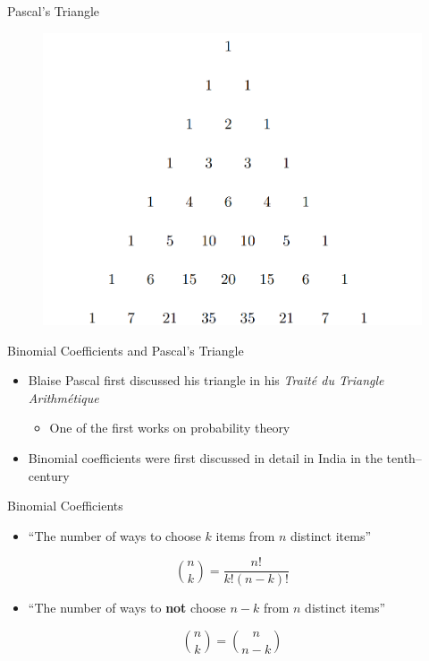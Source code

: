 \documentclass[aspectratio=169]{beamer}
\begin{document}
\begin{frame}{Pascal's Triangle}
    \begin{figure}
        \centering
        \includegraphics[scale=1]{images/Pascal8.png}
    \end{figure}
\end{frame}

\begin{frame}{Binomial Coefficients and Pascal's Triangle}
    \begin{itemize}
        \item Blaise Pascal first discussed his triangle in his \textit{Trait\'e du Triangle Arithm\'etique} \cite{book:arithmetique}
        \begin{itemize}
            \item One of the first works on probability theory
        \end{itemize} \pause
        \item Binomial coefficients were first discussed in detail in India in the tenth--century \cite{book:TAOCP1}
    \end{itemize}
\end{frame}

\begin{frame}{Binomial Coefficients}
    \begin{itemize}
        \item ``The number of ways to choose $k$ items from $n$ distinct items''
    \end{itemize}
    \[
        \binom{n}{k} = \frac{n!}{k! (n - k)!}
    \] \pause
    
    \begin{itemize}
        \item ``The number of ways to \textbf{not} choose $n - k$ from $n$ distinct items''
    \end{itemize}
    \[
        \binom{n}{k} = \binom{n}{n - k}
    \]
\end{frame}
\end{document}
